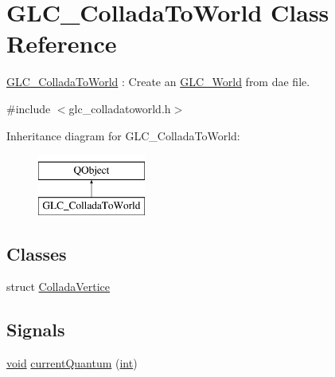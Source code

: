 \hypertarget{class_g_l_c___collada_to_world}{\section{G\-L\-C\-\_\-\-Collada\-To\-World Class Reference}
\label{class_g_l_c___collada_to_world}
}


\hyperlink{class_g_l_c___collada_to_world}{G\-L\-C\-\_\-\-Collada\-To\-World} \-: Create an \hyperlink{class_g_l_c___world}{G\-L\-C\-\_\-\-World} from dae file.  




{\ttfamily \#include $<$glc\-\_\-colladatoworld.\-h$>$}

Inheritance diagram for G\-L\-C\-\_\-\-Collada\-To\-World\-:\begin{figure}[H]
\begin{center}
\leavevmode
\includegraphics[height=2.000000cm]{class_g_l_c___collada_to_world}
\end{center}
\end{figure}
\subsection*{Classes}
\begin{DoxyCompactItemize}
\item 
struct \hyperlink{struct_g_l_c___collada_to_world_1_1_collada_vertice}{Collada\-Vertice}
\end{DoxyCompactItemize}
\subsection*{Signals}
\begin{DoxyCompactItemize}
\item 
\hyperlink{group___u_a_v_objects_plugin_ga444cf2ff3f0ecbe028adce838d373f5c}{void} \hyperlink{class_g_l_c___collada_to_world_afa500bac4812b889273af4a68dc1987d}{current\-Quantum} (\hyperlink{ioapi_8h_a787fa3cf048117ba7123753c1e74fcd6}{int})
\end{DoxyCompactItemize}

